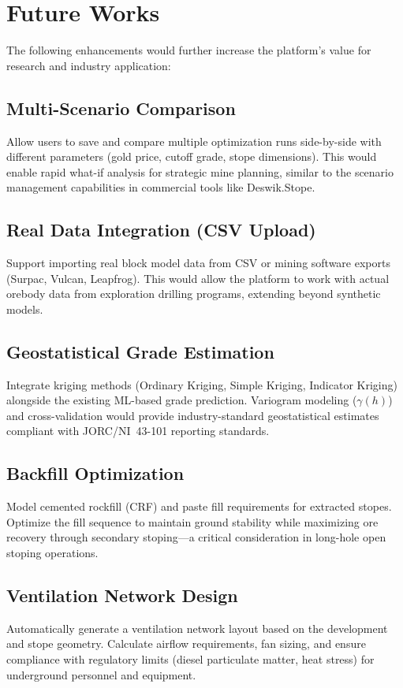 \documentclass[12pt,a4paper]{article}
\begin{document}
\section{Future Works}
\label{sec:future}

The following enhancements would further increase the platform's value for research and industry application:

\subsection{Multi-Scenario Comparison}
Allow users to save and compare multiple optimization runs side-by-side with different parameters (gold price, cutoff grade, stope dimensions). This would enable rapid what-if analysis for strategic mine planning, similar to the scenario management capabilities in commercial tools like Deswik.Stope.

\subsection{Real Data Integration (CSV Upload)}
Support importing real block model data from CSV or mining software exports (Surpac, Vulcan, Leapfrog). This would allow the platform to work with actual orebody data from exploration drilling programs, extending beyond synthetic models.

\subsection{Geostatistical Grade Estimation}
Integrate kriging methods (Ordinary Kriging, Simple Kriging, Indicator Kriging) alongside the existing ML-based grade prediction. Variogram modeling ($\gamma(h)$) and cross-validation would provide industry-standard geostatistical estimates compliant with JORC/NI~43-101 reporting standards.

\subsection{Backfill Optimization}
Model cemented rockfill (CRF) and paste fill requirements for extracted stopes. Optimize the fill sequence to maintain ground stability while maximizing ore recovery through secondary stoping---a critical consideration in long-hole open stoping operations.

\subsection{Ventilation Network Design}
Automatically generate a ventilation network layout based on the development and stope geometry. Calculate airflow requirements, fan sizing, and ensure compliance with regulatory limits (diesel particulate matter, heat stress) for underground personnel and equipment.
\end{document}

